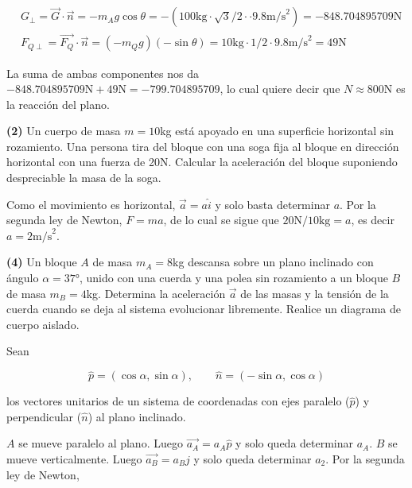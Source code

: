 \documentclass[12pt]{article}
\theoremstyle{definition}
\begin{document}
\begin{align*}
    &G_{\perp} = \vec{G} \cdot \vec{n} = -m_A g \cos \theta = - ( 100\text{kg}
    \cdot
    \sqrt{3}/2 \cdot
    \cdot 9.8\text{m/s}^2) = -848.704895709\text{N}\\
    &F_{Q \perp} = \vec{F_Q} \cdot \vec{n} = (-m_Q g)(- \sin \theta) =
    10\text{kg} \cdot 1 / 2 \cdot 9.8\text{m/s}^2 =  49\text{N}
\end{align*}

La suma de ambas componentes nos da $-848.704895709\text{N} + 49\text{N} =
-799.704895709$, lo cual quiere decir que $N \approx 800\text{N}$ es la reacción
del plano.

\pagebreak 

\begin{shaded}
    \textbf{(2)} Un cuerpo de masa $m = 10$kg está apoyado en una superficie
    horizontal sin rozamiento. Una persona tira del bloque con una soga fija al
    bloque en dirección horizontal con una fuerza de 20N. Calcular la
    aceleración del bloque suponiendo despreciable la masa de la soga.
\end{shaded}

Como el movimiento es horizontal, $\vec{a} = a \hat{i}$ y solo basta determinar
$a$. Por la segunda ley de Newton, $F = ma$, de lo cual se sigue que 
$20\text{N}/10\text{kg} = a$, es decir $a = 2\text{m/s}^2$.

\pagebreak 

\begin{shaded}
    \textbf{(4)} Un bloque $A$ de masa $m_A = 8$kg descansa sobre un plano
    inclinado con ángulo $\alpha = \ang{37}$, unido con una cuerda y una polea
    sin rozamiento a un bloque $B$ de masa $m_B = \text{4}$kg. Determina la
    aceleración $\vec{a}$ de las masas y la tensión de la cuerda cuando se deja
    al sistema evolucionar libremente. Realice un diagrama de cuerpo aislado.
\end{shaded}

Sean 

\begin{equation*}
    \hat{p} = (\cos \alpha, \sin \alpha),\qquad \hat{n} = (-\sin \alpha, \cos\alpha)
\end{equation*}

los vectores unitarios de un sistema de coordenadas con ejes paralelo
($\hat{p}$) y perpendicular ($\hat{n}$) al plano inclinado.

$A$ se mueve paralelo al plano. Luego $\vec{a_A} = a_A \hat{p}$ y solo queda
determinar $a_A$. $B$ se mueve verticalmente. Luego $\vec{a_B} = a_B \hat{j}$ y
solo queda determinar $a_2$. Por la segunda ley de Newton, 
\end{document}
